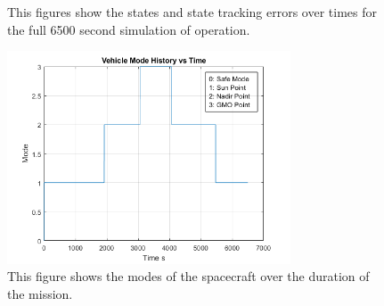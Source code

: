 \documentclass[paper]{aiaaNew}
\begin{document}



\begin{figure}[!htbp] 
\centering     %
{}
\caption{This figures show the states and state tracking errors over times for the full 6500 second simulation of operation.}
\end{figure}

\begin{figure}[!htbp] 
  \centering
  \includegraphics[width=0.75\textwidth]{Figures/T11_modehistory.png}
  \caption{This figure shows the modes of the spacecraft over the duration of the mission.}
  \label{fig:T11_mode}
 \end{figure}
\end{document}
